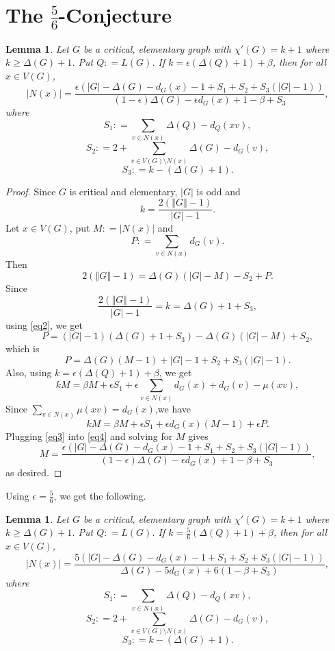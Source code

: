 \documentclass[12pt]{amsart}
\theoremstyle{plain}
\newtheorem{lem}[thm]{Lemma}
\theoremstyle{definition}
\theoremstyle{remark}
\newcommand{\card}[1]{\left|#1\right|}
\newcommand{\size}[1]{\left\Vert#1\right\Vert}
\newcommand{\parens}[1]{\left( #1 \right)}
\newcommand{\DefinedAs}{\mathrel{\mathop:}=}
\begin{document}
\section{The $\frac56$-Conjecture}
\begin{lem}
Let $G$ be a critical, elementary graph with $\chi'(G) = k + 1$ where $k \ge \Delta(G) + 1$.  Put $Q \DefinedAs L(G)$.  
If $k = \epsilon\parens{\Delta(Q) + 1} + \beta$, then for all $x \in V(G)$,
\[\card{N(x)} = \frac{\epsilon\parens{|G| - \Delta(G) - d_G(x) - 1 + S_1 + S_2 + S_3\parens{\card{G} - 1}}}{(1-\epsilon)\Delta(G) - \epsilon d_G(x) + 1 - \beta + S_3},\]
where 
\[S_1 \DefinedAs \sum_{v \in N(x)} \Delta(Q) - d_Q(xv),\]
\[S_2 \DefinedAs 2 + \sum_{v \in V(G) \setminus N(x)} \Delta(G) - d_G(v),\]
\[S_3 \DefinedAs k - (\Delta(G) + 1).\]
\end{lem}
\begin{proof}
Since $G$ is critical and elementary, $\card{G}$ is odd and
\begin{equation}\label{eq1}
k = \frac{2(\size{G} - 1)}{\card{G} - 1}.
\end{equation}
Let $x \in V(G)$, put $M \DefinedAs \card{N(x)}$ and 
\[P \DefinedAs \sum_{v \in N(x)} d_G(v).\] 
Then
\begin{equation}\label{eq2}
2(\size{G} - 1) = \Delta(G)(|G| - M) - S_2 + P.
\end{equation}
Since 
\[\frac{2(\size{G} - 1)}{\card{G} - 1} = k = \Delta(G) + 1 + S_3,\]
using \eqref{eq2}, we get
\[P = (|G| - 1)(\Delta(G) + 1 + S_3) - \Delta(G)(|G| - M) + S_2,\]
which is
\begin{equation}\label{eq3}
P = \Delta(G)(M-1) + |G| - 1 + S_2 + S_3(|G| - 1).
\end{equation}
Also, using $k = \epsilon\parens{\Delta(Q) + 1} + \beta$, we get
\[kM = \beta M + \epsilon S_1 + \epsilon\sum_{v \in N(x)} d_G(x) + d_G(v) - \mu(xv),\]
Since $\sum_{v \in N(x)} \mu(xv) = d_G(x)$,we have
\begin{equation}\label{eq4}
kM = \beta M + \epsilon S_1 + \epsilon d_G(x)(M - 1) + \epsilon P.
\end{equation}
Plugging \eqref{eq3} into \eqref{eq4} and solving for $M$ gives
\[M= \frac{\epsilon\parens{|G| - \Delta(G) - d_G(x) - 1 + S_1 + S_2 + S_3\parens{\card{G} - 1}}}{(1-\epsilon)\Delta(G) - \epsilon d_G(x) + 1 - \beta + S_3},\]
as desired.
\end{proof}

Using $\epsilon = \frac56$, we get the following.

\begin{lem}\label{Slacked56}
Let $G$ be a critical, elementary graph with $\chi'(G) = k + 1$ where $k \ge \Delta(G) + 1$.  Put $Q \DefinedAs L(G)$. 
If $k = \frac56\parens{\Delta(Q) + 1} + \beta$, then for all $x \in V(G)$,
\[\card{N(x)} = \frac{5\parens{|G| - \Delta(G) - d_G(x) - 1 + S_1 + S_2 + S_3\parens{\card{G} - 1}}}{\Delta(G) - 5 d_G(x) + 6(1 - \beta + S_3)},\]
where 
\[S_1 \DefinedAs \sum_{v \in N(x)} \Delta(Q) - d_Q(xv),\]
\[S_2 \DefinedAs 2 + \sum_{v \in V(G) \setminus N(x)} \Delta(G) - d_G(v),\]
\[S_3 \DefinedAs k - (\Delta(G) + 1).\]
\end{lem}
\end{document}
